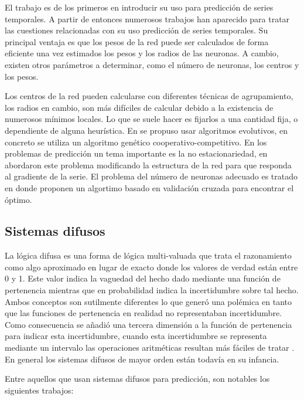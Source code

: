 \documentclass{llncs}
\begin{document}
El trabajo \cite{chen1991orthogonal} es de los primeros en introducir su uso para predicción de series temporales. A partir de entonces numerosos trabajos han aparecido para tratar las cuestiones relacionadas con su uso predicción de series temporales. Su principal ventaja es que los pesos de la red puede ser calculados de forma eficiente una vez estimados los pesos y los radios de las neuronas. A cambio, existen otros parámetros a determinar, como el número de neuronas, los centros y los pesos.

Los centros de la red pueden calcularse con diferentes técnicas de agrupamiento, los radios en cambio, son más difíciles de calcular debido a la existencia de numerosos mínimos locales. Lo que se suele hacer es fijarlos a una cantidad fija, o dependiente de alguna heurística. En \cite{whitehead1996cooperative} se propuso usar algoritmos evolutivos, en concreto se utiliza un algoritmo genético cooperativo-competitivo. En los problemas de predicción un tema importante es la no estacionariedad, en \cite{chng1996gradient} abordaron este problema modificando la estructura de la red para que responda al gradiente de la serie. El problema del número de neuronas adecuado es tratado en \cite{leung2001prediction} donde proponen un algortimo basado en validación cruzada para encontrar el óptimo.

\subsection{Sistemas difusos}
La lógica difusa es una forma de lógica multi-valuada que trata el razonamiento como algo aproximado en lugar de exacto donde los valores de verdad están entre 0 y 1. Este valor indica la vaguedad del hecho dado mediante una función de pertenencia mientras que en probabilidad indica la incertidumbre sobre tal hecho. Ambos conceptos son sutilmente diferentes lo que generó una polémica en tanto que las funciones de pertenencia en realidad no representaban incertidumbre. Como consecuencia se añadió una tercera dimensión a la función de pertenencia para indicar esta incertidumbre, cuando esta incertidumbre se representa mediante un intervalo las operaciones aritméticas resultan más fáciles de tratar \cite{liang2000interval}. En general los sistemas difusos de mayor orden están todavía en su infancia.

Entre aquellos que usan sistemas difusos para predicción, son notables los siguientes trabajos:
\end{document}

